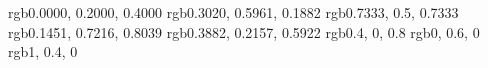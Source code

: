 \definecolor{kon}    {rgb}{0.0000, 0.2000, 0.4000}
\definecolor{moegi}  {rgb}{0.3020, 0.5961, 0.1882}
\definecolor{sssec}  {rgb}{0.7333, 0.5, 0.7333}
\definecolor{sora}   {rgb}{0.1451, 0.7216, 0.8039}
\definecolor{sumire} {rgb}{0.3882, 0.2157, 0.5922}
\definecolor{wwqqcc} {rgb}{0.4, 0, 0.8}
\definecolor{qqzzqq} {rgb}{0, 0.6, 0}
\definecolor{ffwwqq} {rgb}{1, 0.4, 0}
\newcommand{\pageautoref}[1]{%
  \ifthenelse{\equal{\pageref{#1}}{\thepage}}%
    {\autoref{#1}}%
    {\autoref{#1}~[p.\pageref{#1}]}%
}
\newcommand{\pageeqref}[1]{%
  \ifthenelse{\equal{\pageref{#1}}{\thepage}}%
    {\eqref{#1}}%
    {\eqref{#1}~[p.\pageref{#1}]}%
}
\setlength{\abovecaptionskip}{0pt}
\newcommand{\modcaptionof}[2]{%
  \captionof{#1}{%
    \csname #1name\endcsname\thechapter.%
    \ifnum\value{#1}<10 0\fi
      \arabic{#1}. #2}}
\newcommand\PartSeparateline[1]{\addtocontents{#1}{\protect\par\protect\hrulefill\protect\par\protect\vspace*{-10pt}}}%
\newcommand\tocAPartSeparateline[3]{\addtocontents{#1}{\protect\par\protect\vspace*{#2}\protect\hrule width 0.5\linewidth\protect\par\protect\vspace*{#3}}}%
\newcommand{\Appendixpart}{
  \clearrightpage
  \part*{\partname\ \thepart\hx の補遺\label{Apart:\thepart}}
  \addcontentsline{toc}{part}{\partname\ \thepart\hx の補遺}
}
